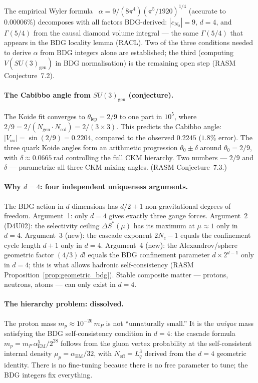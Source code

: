 \documentclass[11pt,a4paper]{article}
\begin{document}
The empirical Wyler formula~\citep{Wyler1969} $\alpha = 9/(8\pi^4)(\pi^5/1920)^{1/4}$
(accurate to $0.00006\%$) decomposes with all factors BDG-derived: $|c_{N_2}| = 9$,
$d = 4$, and $\Gamma(5/4)$ from the causal diamond volume integral --- the same
$\Gamma(5/4)$ that appears in the BDG locality lemma (RACL). Two of the three
conditions needed to derive $\alpha$ from BDG integers alone are established;
the third (computing $V(SU(3)_{\mathrm{gen}})$ in BDG normalisation) is the
remaining open step (RASM Conjecture~7.2).

\paragraph{The Cabibbo angle from $SU(3)_{\mathrm{gen}}$ (conjecture).}
The Koide fit converges to $\theta_{\mathrm{lep}} = 2/9$ to one part in $10^5$,
where $2/9 = 2/(N_{\mathrm{gen}} \cdot N_{\mathrm{col}}) = 2/(3\times 3)$.
This predicts the Cabibbo angle: $|V_{us}| = \sin(2/9) = 0.2204$,
compared to the observed $0.2245$ ($1.8\%$ error).
The three quark Koide angles form an arithmetic progression
$\theta_0 \pm \delta$ around $\theta_0 = 2/9$,
with $\delta \approx 0.0665~\mathrm{rad}$ controlling the full CKM hierarchy.
Two numbers --- $2/9$ and $\delta$ --- parametrize all three CKM mixing angles.
(RASM Conjecture~7.3.)

\paragraph{Why $d = 4$: four independent uniqueness arguments.}
The BDG action in $d$ dimensions has $d/2 + 1$ non-gravitational degrees
of freedom. Argument~1: only $d = 4$ gives exactly three gauge forces.
Argument~2 (D4U02): the selectivity ceiling $\Delta S^*(\mu)$ has its
maximum at $\mu \approx 1$ only in $d = 4$.
Argument~3 (new): the cascade exponent $2N_c - 1$ equals the confinement
cycle length $d + 1$ only in $d = 4$.
Argument~4 (new): the Alexandrov/sphere geometric factor $(4/3)\,d!$
equals the BDG confinement parameter $d \times 2^{d-1}$ only in $d = 4$;
this is what allows hadronic self-consistency (RASM
Proposition~\ref*{prop:geometric_bdg}). Stable composite
matter --- protons, neutrons, atoms --- can only exist in $d = 4$.

\paragraph{The hierarchy problem: dissolved.}
The proton mass $m_p \approx 10^{-20}\,m_P$ is not ``unnaturally small.''
It is the \emph{unique} mass satisfying the BDG self-consistency condition
in $d = 4$: the cascade formula $m_p = m_P\,\alpha_{\mathrm{EM}}^5/2^{28}$
follows from the gluon vertex probability at the self-consistent internal
density $\mu_p = \alpha_{\mathrm{EM}}/32$, with $N_{\mathrm{eff}} = L_q^3$
derived from the $d = 4$ geometric identity. There is no fine-tuning because
there is no free parameter to tune; the BDG integers fix everything.
\end{document}
